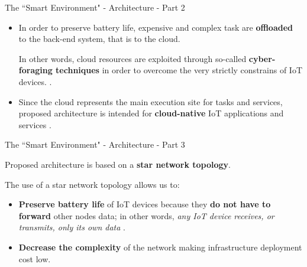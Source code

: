 \documentclass[10pt]{beamer}
\begin{document}
\begin{frame}{The ``Smart Environment" - Architecture - Part 2}

\begin{itemize}
\justifying
\item In order to preserve battery life, expensive and complex task are \textbf{offloaded} to the back-end system, that is to the cloud. 

In other words, cloud resources are exploited through so-called \textbf{cyber-foraging techniques} in order to overcome the very strictly constrains of IoT devices. \cite{TheSeminalRoleEdgeNativeApplications}. 

\item Since the cloud represents the main execution site for tasks and services, proposed architecture is intended for \textbf{cloud-native} IoT applications and services \cite{TheSeminalRoleEdgeNativeApplications}.

\end{itemize}

\end{frame} 
\begin{frame}{The ``Smart Environment" - Architecture - Part 3}

\begin{block}{}
Proposed architecture is based on a \textbf{star network topology}.
\end{block}

The use of a star network topology allows us to:

\begin{itemize}
\justifying
\item \textbf{Preserve battery life} of IoT devices because they \textbf{do not have to forward} other nodes data; in other words, \textit{any IoT device receives, or transmits, only its own data} \cite{LoRaWAN}.

\item \textbf{Decrease the complexity} of the network \cite{LoRaWAN} making infrastructure deployment cost low.

\end{itemize}

\end{frame} 
\end{document}
